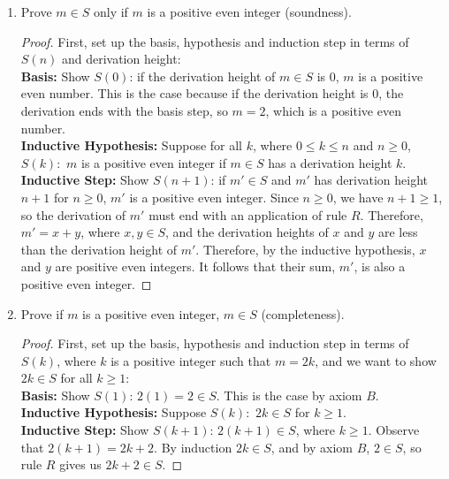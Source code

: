 \documentclass[]{exam}
\theoremstyle{definition}
\begin{document}
\begin{questions}
\begin{enumerate}[label=\alph*)]
\item Prove $m \in S$ only if $m$ is a positive even integer (soundness). 
\begin{solution}
\begin{proof}
First, set up the basis, hypothesis and induction step in terms of $S(n)$ and
derivation height:
~\\
\textbf{Basis:} Show $S(0)$: if the derivation height of $m \in S$ is $0$, $m$ is a
positive even number. This is the case because if the derivation height is $0$,
the derivation ends with the basis step, so $m = 2$, which is a positive even
number.
~\\
\textbf{Inductive Hypothesis:} Suppose for all $k$, where $0 \leq k \leq n$ and
$n \geq 0$, $S(k):$ $m$ is a positive even integer if $m \in S$ has a derivation
height $k$.
~\\
\textbf{Inductive Step:} Show $S(n+1)$: if $m' \in S$ and $m'$ has derivation
height $n + 1$ for $n \geq 0$, $m'$ is a positive even integer. Since $n \geq 0$,
we have $n + 1 \geq 1$, so the derivation of $m'$ must end with an application of
rule $R$. Therefore, $m' = x + y$, where $x,y \in S$, and the derivation heights
of $x$ and $y$ are less than the derivation height of $m'$. Therefore, by the
inductive hypothesis, $x$ and $y$ are positive even integers. It follows that
their sum, $m'$, is also a positive even integer.
\end{proof}

\end{solution}
\item Prove if $m$ is a positive even integer, $m \in S$ (completeness).
\begin{solution}
\begin{proof}
First, set up the basis, hypothesis and induction step in terms of $S(k)$,
where $k$ is a positive integer such that $m = 2k$, and we want to show
$2k \in S$ for all $k \geq 1$:
~\\
\textbf{Basis:} Show $S(1)$: $2(1) = 2 \in S$. This is the case by axiom $B$.
~\\
\textbf{Inductive Hypothesis:} Suppose $S(k):$ $2k \in S$ for $k \geq 1$.
~\\
\textbf{Inductive Step:} Show $S(k+1)$: $2(k+1) \in S$, where $k \geq 1$.
Observe that $2(k + 1) = 2k + 2$. By induction $2k \in S$, and by axiom
$B$, $2 \in S$, so rule $R$ gives us $2k + 2 \in S$.
\end{proof}


\end{solution}
\end{enumerate}
\end{questions}
\end{document}
